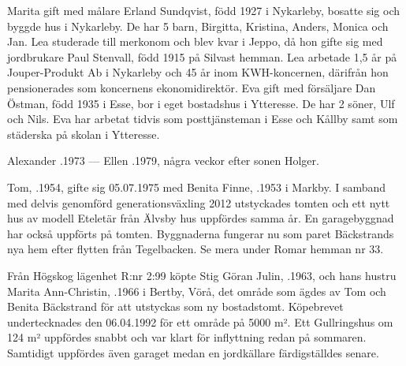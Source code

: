Marita gift med målare Erland Sundqvist, född 1927 i Nykarleby, bosatte sig och byggde hus i Nykarleby. De har 5 barn, Birgitta, Kristina, Anders, Monica och Jan. Lea studerade till merkonom och blev kvar i Jeppo, då hon gifte sig med jordbrukare Paul Stenvall, född 1915 på Silvast hemman. Lea arbetade 1,5 år på Jouper-Produkt Ab i Nykarleby och 45 år inom KWH-koncernen, därifrån hon pensionerades som koncernens ekonomidirektör. Eva gift med försäljare Dan Östman, född 1935 i Esse, bor i eget bostadshus i Ytteresse. De har 2 söner, Ulf och Nils. Eva har arbetat tidvis som posttjänsteman i Esse och Kållby samt som städerska på skolan i Ytteresse.

Alexander .1973  ---   Ellen .1979, några veckor efter sonen Holger.



%



%
Tom, .1954, gifte sig 05.07.1975 med Benita Finne, .1953 i Markby. I samband med delvis genomförd generationsväxling 2012 utstyckades tomten och ett nytt hus av modell Eteletär från Älvsby hus uppfördes samma år. En garagebyggnad har också uppförts på tomten. Byggnaderna fungerar nu som paret Bäckstrands nya hem efter flytten från Tegelbacken. Se mera under Romar hemman nr 33.


%


%
Från Högskog lägenhet R:nr 2:99 köpte Stig Göran Julin, .1963, och hans hustru Marita Ann-Christin, .1966 i Bertby, Vörå, det område som ägdes av Tom och Benita Bäckstrand för att utstyckas som ny bostadstomt. Köpebrevet undertecknades den 06.04.1992 för ett område på 5000 m². Ett Gullringshus om 124 m² uppfördes snabbt och var klart för inflyttning redan på sommaren. Samtidigt uppfördes även garaget medan en jordkällare färdigställdes senare.

